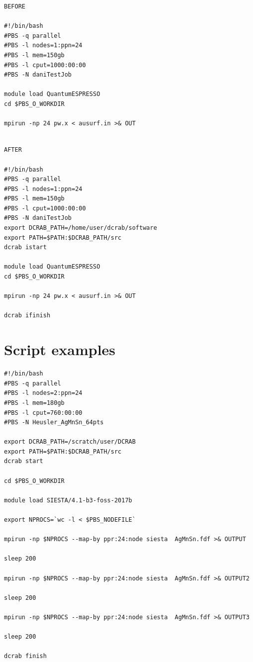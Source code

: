 \documentclass[10pt,a4paper]{report}
\begin{document}
\pagebreak

\begin{multicols}{2}
\begin{verbatim}
BEFORE

#!/bin/bash
#PBS -q parallel
#PBS -l nodes=1:ppn=24
#PBS -l mem=150gb
#PBS -l cput=1000:00:00
#PBS -N daniTestJob

module load QuantumESPRESSO
cd $PBS_O_WORKDIR

mpirun -np 24 pw.x < ausurf.in >& OUT

\end{verbatim}

\columnbreak

\begin{verbatim}

AFTER

#!/bin/bash
#PBS -q parallel
#PBS -l nodes=1:ppn=24
#PBS -l mem=150gb
#PBS -l cput=1000:00:00
#PBS -N daniTestJob
export DCRAB_PATH=/home/user/dcrab/software
export PATH=$PATH:$DCRAB_PATH/src
dcrab istart

module load QuantumESPRESSO
cd $PBS_O_WORKDIR

mpirun -np 24 pw.x < ausurf.in >& OUT

dcrab ifinish
\end{verbatim}
\end{multicols}

\chapter{Script examples}

\begin{verbatim}
#!/bin/bash
#PBS -q parallel
#PBS -l nodes=2:ppn=24
#PBS -l mem=180gb
#PBS -l cput=760:00:00
#PBS -N Heusler_AgMnSn_64pts

export DCRAB_PATH=/scratch/user/DCRAB
export PATH=$PATH:$DCRAB_PATH/src
dcrab start

cd $PBS_O_WORKDIR

module load SIESTA/4.1-b3-foss-2017b

export NPROCS=`wc -l < $PBS_NODEFILE`

mpirun -np $NPROCS --map-by ppr:24:node siesta  AgMnSn.fdf >& OUTPUT

sleep 200

mpirun -np $NPROCS --map-by ppr:24:node siesta  AgMnSn.fdf >& OUTPUT2

sleep 200

mpirun -np $NPROCS --map-by ppr:24:node siesta  AgMnSn.fdf >& OUTPUT3

sleep 200

dcrab finish
\end{verbatim}
\end{document}
